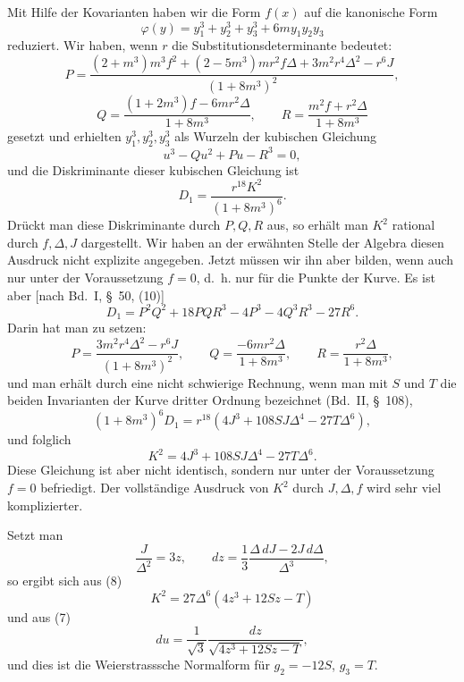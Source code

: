 \documentclass[11pt]{article}
\begin{document}
Mit Hilfe der Kovarianten haben wir die Form $f(x)$ auf die kanonische Form
\[
\varphi(y)=y_1^3+y_2^3+y_3^3+6my_1y_2y_3
\]
reduziert. Wir haben, wenn $r$ die Substitutionsdeterminante bedeutet:
\[
P=\frac{(2+m^3)m^3f^2+(2-5m^3)mr^2f\Delta+3m^2r^4\Delta^2-r^6J}{(1+8m^3)^2},
\]
\[
Q=\frac{(1+2m^3)f-6mr^2\Delta}{1+8m^3},\qquad
R=\frac{m^2f+r^2\Delta}{1+8m^3}
\]
gesetzt und erhielten $y_1^3,y_2^3,y_3^3$ als Wurzeln der kubischen Gleichung
\[
u^3-Qu^2+Pu-R^3=0,
\]
und die Diskriminante dieser kubischen Gleichung ist
\[
D_1=\frac{r^{18}K^2}{(1+8m^3)^6}.
\]
Drückt man diese Diskriminante durch $P,Q,R$ aus, so erhält man $K^2$ rational durch $f,\Delta,J$ dargestellt. Wir haben an der erwähnten Stelle der Algebra diesen Ausdruck nicht explizite angegeben. Jetzt müssen wir ihn aber bilden, wenn auch nur unter der Voraussetzung $f=0$, d.~h. nur für die Punkte der Kurve. Es ist aber [nach Bd.~I, \S~50, (10)]
\[
D_1=P^2Q^2+18PQR^3-4P^3-4Q^3R^3-27R^6.
\]
Darin hat man zu setzen:
\[
P=\frac{3m^2r^4\Delta^2-r^6J}{(1+8m^3)^2},\qquad
Q=\frac{-6mr^2\Delta}{1+8m^3},\qquad
R=\frac{r^2\Delta}{1+8m^3},
\]
und man erhält durch eine nicht schwierige Rechnung, wenn man mit $S$ und $T$ die beiden Invarianten der Kurve dritter Ordnung bezeichnet (Bd.~II, \S~108),
\[
(1+8m^3)^6D_1=r^{18}(4J^3+108SJ\Delta^4-27T\Delta^6),
\]
und folglich
\begin{equation}
K^2=4J^3+108SJ\Delta^4-27T\Delta^6.
\tag{8}
\end{equation}
Diese Gleichung ist aber nicht identisch, sondern nur unter der Voraussetzung $f=0$ befriedigt. Der vollständige Ausdruck von $K^2$ durch $J,\Delta,f$ wird sehr viel komplizierter.

Setzt man
\begin{equation}
\frac{J}{\Delta^2}=3z,\qquad dz=\frac13\frac{\Delta\,dJ-2J\,d\Delta}{\Delta^3},
\tag{9}
\end{equation}
so ergibt sich aus (8)
\[
K^2=27\Delta^6(4z^3+12Sz-T)
\]
und aus (7)
\begin{equation}
du=\frac1{\sqrt3}\frac{dz}{\sqrt{4z^3+12Sz-T}},
\tag{10}
\end{equation}
und dies ist die Weierstrasssche Normalform für $g_2=-12S$, $g_3=T$.
\end{document}
